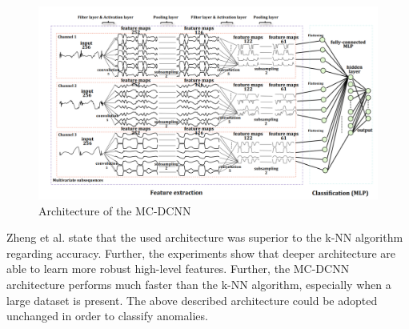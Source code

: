 \begin{figure}[h]
	\centering
	\includegraphics[scale=0.35]{Figures/MC-DCNN}
	\decoRule
	\caption[Architecture of the MC-DCNN]{Architecture of the MC-DCNN \parencite{Zheng2014}}
	\label{fig:MC-DCNN}
\end{figure}

Zheng et al. \parencite*{Zheng2014} state that the used architecture was superior to the k-NN algorithm regarding accuracy. Further, the experiments show that deeper architecture are able to learn more robust high-level features. Further, the MC-DCNN architecture performs much faster than the k-NN algorithm, especially when a large dataset is present. The above described architecture could be adopted unchanged in order to classify anomalies.

